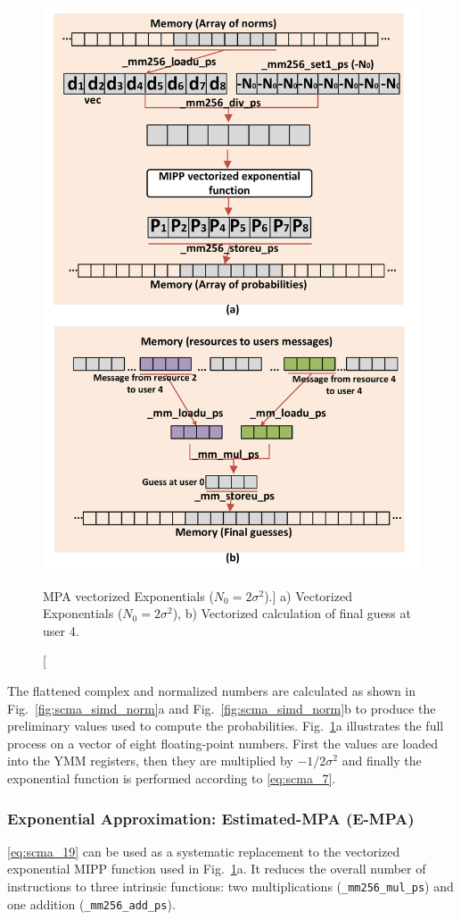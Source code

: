 \begin{figure}[htp]
  \centering
  \includegraphics[width=0.70\linewidth]{scma/simd_exp_mul/simd_exp_mul}
  \caption
    [MPA vectorized Exponentials ($N_0 = 2\sigma^2$).]
    {a) Vectorized Exponentials ($N_0 = 2\sigma^2$),
     b) Vectorized calculation of final guess at user 4.}
  \label{fig:scma_simd_exp_mul}
\end{figure}

The flattened complex and normalized numbers are calculated as shown in
Fig.~\ref{fig:scma_simd_norm}a and Fig.~\ref{fig:scma_simd_norm}b to produce the
preliminary values used to compute the probabilities.
Fig.~\ref{fig:scma_simd_exp_mul}a illustrates the full process on a vector of
eight floating-point numbers. First the values are loaded into the YMM
registers, then they are multiplied by $-1/2\sigma^2$ and finally the
exponential function is performed according to \eqref{eq:scma_7}.

\subsubsection{Exponential Approximation: Estimated-MPA (E-MPA)}

\eqref{eq:scma_19} can be used as a systematic replacement to the vectorized
exponential MIPP function used in Fig.~\ref{fig:scma_simd_exp_mul}a. It reduces
the overall number of instructions to three intrinsic functions: two
multiplications (\verb|_mm256_mul_ps|) and one addition (\verb|_mm256_add_ps|).

